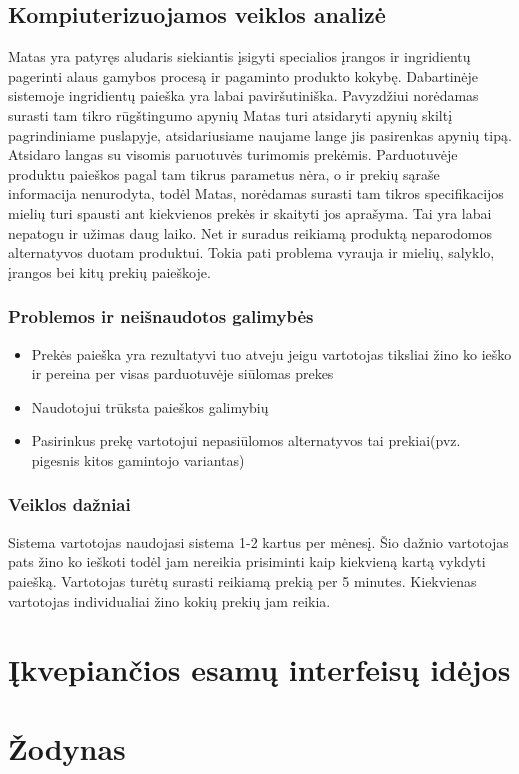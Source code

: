 \documentclass[oneside]{VUMIFPSkursinis}
\begin{document}
	\subsection{Kompiuterizuojamos veiklos analizė}
		Matas yra patyręs aludaris siekiantis įsigyti specialios įrangos ir ingridientų pagerinti alaus gamybos procesą ir pagaminto produkto kokybę. 
		Dabartinėje sistemoje ingridientų paieška yra labai paviršutiniška. 
		Pavyzdžiui norėdamas surasti tam tikro rūgštingumo apynių Matas turi atsidaryti apynių skiltį pagrindiniame puslapyje, atsidariusiame naujame lange jis pasirenkas apynių tipą. 
		Atsidaro langas su visomis paruotuvės turimomis prekėmis. 
		Parduotuvėje produktu paieškos pagal tam tikrus parametus nėra, o ir prekių sąraše informacija nenurodyta, todėl Matas, norėdamas surasti tam tikros specifikacijos mielių turi spausti ant kiekvienos prekės ir skaityti jos aprašyma. 
		Tai yra labai nepatogu ir užimas daug laiko. 
		Net ir suradus reikiamą produktą neparodomos alternatyvos duotam produktui. 
		Tokia pati problema vyrauja ir mielių, salyklo, įrangos bei kitų prekių paieškoje.

	\subsubsection{Problemos ir neišnaudotos galimybės}
		\begin{itemize}
			\item{Prekės paieška yra rezultatyvi tuo atveju jeigu vartotojas tiksliai žino ko ieško ir pereina per visas parduotuvėje siūlomas prekes}
			\item{Naudotojui trūksta paieškos galimybių}
			\item{Pasirinkus prekę vartotojui nepasiūlomos alternatyvos tai prekiai(pvz. pigesnis kitos gamintojo variantas)}
		\end{itemize}
	\subsubsection{Veiklos dažniai}
		Sistema vartotojas naudojasi sistema 1-2 kartus per mėnesį. 
		Šio dažnio vartotojas pats žino ko ieškoti todėl jam nereikia prisiminti kaip kiekvieną kartą vykdyti paiešką. 
		Vartotojas turėtų surasti reikiamą prekią per 5 minutes. 
		Kiekvienas vartotojas individualiai žino kokių prekių jam reikia.

\section{Įkvepiančios esamų interfeisų idėjos}

\section{Žodynas}
\end{document}
